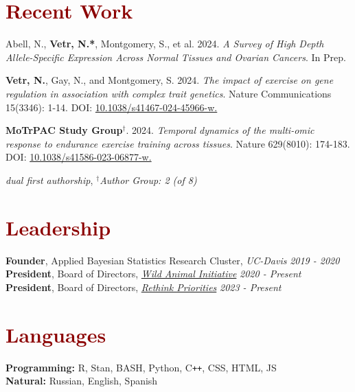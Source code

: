 \documentclass[11pt,margin,line]{resume}
\begin{document}
\begin{resume}
\section{\large\textcolor{DarkRed}{Recent Work}}

Abell, N., \textbf{Vetr, N.*},  Montgomery, S., et al.  2024.  \emph{A Survey of High Depth Allele-Specific Expression Across Normal Tissues and Ovarian Cancers}.  In Prep.

\textbf{Vetr, N.},  Gay,  N.,  and Montgomery,  S.  2024.  \emph{The impact of exercise on gene regulation in association with complex trait genetics}.  Nature Communications 15(3346): 1-14. DOI: \href{https://doi.org/10.1038/s41467-024-45966-w}{\color{blue}10.1038/s41467-024-45966-w.}

\textbf{MoTrPAC Study Group}$^{\dag}$. 2024.  \emph{Temporal dynamics of the multi-omic response to endurance exercise training across tissues}.  Nature 629(8010): 174-183. DOI: \href{https://doi.org/10.1038/s41586-023-06877-w}{\color{blue}10.1038/s41586-023-06877-w.}

\vspace{-1.5mm}
{\hfill\small*\textit{dual first authorship}, $^{\dag}$\textit{Author Group: 2 (of 8)}}

\vspace{-1.5mm}
\section{\large\textcolor{DarkRed}{Leadership}}
\textbf{Founder}, Applied Bayesian Statistics Research Cluster, \textit{UC-Davis} \hfill \emph{2019 - 2020}\\
\textbf{President}, Board of Directors, \textit{\href{https://www.wildanimalinitiative.org/}{Wild Animal Initiative}} \hfill \emph{2020 - Present}\\
\textbf{President}, Board of Directors, \textit{\href{https://rethinkpriorities.org/}{Rethink Priorities}} \hfill \emph{2023 - Present}\\

\vspace{-5mm}
\section{\large\textcolor{DarkRed}{Languages}}
\textbf{Programming:} R, Stan, BASH, Python, C\texttt{\texttt{+}\texttt{+}}, CSS, HTML, JS\\
\textbf{Natural:} Russian, English, Spanish

\vspace{-1.5mm}

\end{resume}
\end{document}
